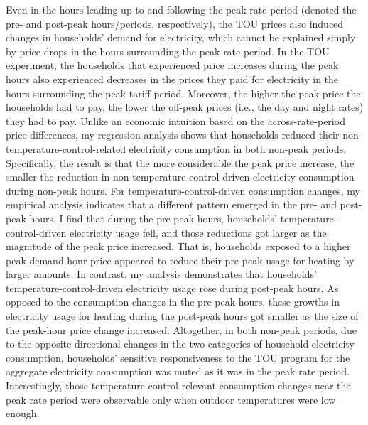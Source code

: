 Even in the hours leading up to and following the peak rate period (denoted the pre- and post-peak hours/periods, respectively), the TOU prices also induced changes in households' demand for electricity, which cannot be explained simply by price drops in the hours surrounding the peak rate period. In the TOU experiment, the households that experienced price increases during the peak hours also experienced decreases in the prices they paid for electricity in the hours surrounding the peak tariff period. Moreover, the higher the peak price the households had to pay, the lower the off-peak prices (i.e., the day and night rates) they had to pay. Unlike an economic intuition based on the across-rate-period price differences, my regression analysis shows that households reduced their non-temperature-control-related electricity consumption in both non-peak periods. Specifically, the result is that the more considerable the peak price increase, the smaller the reduction in non-temperature-control-driven electricity consumption during non-peak hours. For temperature-control-driven consumption changes, my empirical analysis indicates that a different pattern emerged in the pre- and post-peak hours. I find that during the pre-peak hours, households' temperature-control-driven electricity usage fell, and those reductions got larger as the magnitude of the peak price increased. That is, households exposed to a higher peak-demand-hour price appeared to reduce their pre-peak usage for heating by larger amounts. In contrast, my analysis demonstrates that households' temperature-control-driven electricity usage rose during post-peak hours. As opposed to the consumption changes in the pre-peak hours, these growths in electricity usage for heating during the post-peak hours got smaller as the size of the peak-hour price change increased. Altogether, in both non-peak periods, due to the opposite directional changes in the two categories of household electricity consumption, households' sensitive responsiveness to the TOU program for the aggregate electricity consumption was muted as it was in the peak rate period. Interestingly, those temperature-control-relevant consumption changes near the peak rate period were observable only when outdoor temperatures were low enough. 

